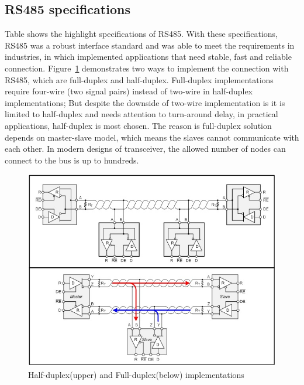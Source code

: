   \subsection{RS485 specifications}
  Table shows the highlight specifications of RS485. With these specifications, RS485 was a robust interface standard and was able to meet the requirements in industries, in which implemented applications that need stable, fast and reliable connection. Figure~\ref{fig:fullHalfDuplex} demonstrates two ways to implement the connection with RS485, which are full-duplex and half-duplex. Full-duplex implementations require four-wire (two signal pairs) instead of two-wire in half-duplex implementations; But despite the downside of two-wire implementation is it is limited to half-duplex and needs attention to turn-around delay, in practical applications, half-duplex is most chosen. The reason is full-duplex solution depends on master-slave model, which means the slaves cannot communicate with each other. In modern designs of transceiver, the allowed number of nodes can connect to the bus is up to hundreds.
    \begin{figure}[!ht]
      \includegraphics[scale=0.85]{images/rs485-fullduplex-halfduplex.jpg}
      \caption{Half-duplex(upper) and Full-duplex(below) implementations}
      \label{fig:fullHalfDuplex}
    \end{figure}


  


